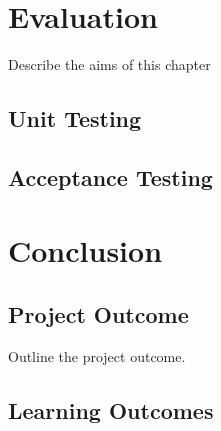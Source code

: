 \documentclass{4thYearProject}
\begin{document}
\chapter{Evaluation}

Describe the aims of this chapter

\section{Unit Testing}
\section{Acceptance Testing}


\chapter{Conclusion}

\section{Project Outcome}

Outline the project outcome. 

\section{Learning Outcomes}







\begin{appendices}
\end{appendices}
\end{document}
